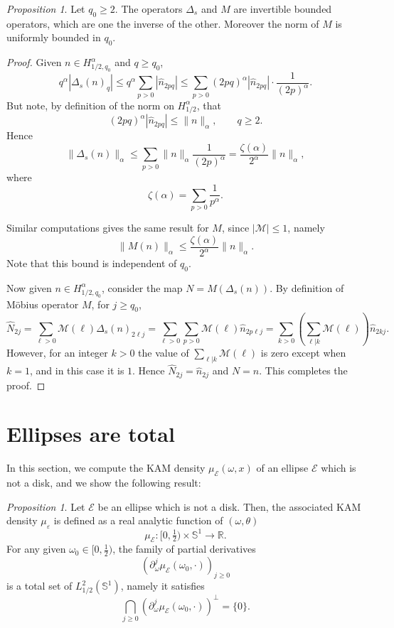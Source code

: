 \documentclass[12pt, openany]{amsart}
\theoremstyle{definition}
\theoremstyle{remark}
\theoremstyle{remark}
\theoremstyle{theorem}
\theoremstyle{theorem}
\theoremstyle{theorem}
\newtheorem{proposition}[theorem]{Proposition}
\theoremstyle{theorem}
\newcommand{\RR}{\mathbb{R}}
\renewcommand{\SS}{\mathbb{S}}
\begin{document}
\begin{proposition}
\label{proposition:invertibility_dirichlet_mobius}
Let $q_0\geq 2$. The operators $\Delta_s$ and $M$ are invertible bounded operators, which are one the inverse of the other. Moreover the norm of $M$ is uniformly bounded in $q_0$.
\end{proposition}

\begin{proof}
Given $n\in H^{\alpha}_{1/2,q_0}$ and $q\geq q_0$, 
\[
q^{\alpha}|\Delta_s(n)_q|
\leq q^{\alpha} \sum_{p>0}|\widehat n_{2p q}|
\leq  \sum_{p>0}(2p q)^{\alpha}|\widehat n_{2p q}|\cdot \frac{1}{(2p)^{\alpha}}.
\]
But note, by definition of the norm on $H^{\alpha}_{1/2}$, that
\[
(2p q)^{\alpha}|\widehat n_{2p q}| \leq \|n\|_{\alpha},\qquad q\geq2.
\]
Hence
\[
\|\Delta_s(n)\|_{\alpha} \leq \sum_{p>0}\|n\|_{\alpha} \frac{1}{(2p)^{\alpha}}
=  \frac{\zeta(\alpha)}{2^{\alpha}}\|n\|_{\alpha},
\]
where
\[
\zeta(\alpha) = \sum_{p>0}\frac{1}{p^{\alpha}}.
\]

Similar computations gives the same result for $M$, since $|\mathscr M|\leq 1$, namely  
\[
\|M(n)\|_{\alpha} \leq \frac{\zeta(\alpha)}{2^{\alpha}}\|n\|_{\alpha}.
\]
Note that this bound is independent of $q_0$.

Now given $n\in H^{\alpha}_{1/2,q_0}$, consider the map $N = M(\Delta_s(n))$. By definition of Möbius operator $M$, for $j\geq q_0$, 
\[
\widehat N_{2j} = \sum_{\ell>0}\mathscr M(\ell)\Delta_s(n)_{2\ell j}
= \sum_{\ell>0}\sum_{p>0}\mathscr M(\ell)\widehat n_{2p\ell j}
= \sum_{k>0}\left(\sum_{\ell|k}\mathscr M(\ell)\right) \widehat n_{2kj}.
\]
However, for an integer $k>0$ the value of $\sum_{\ell|k}\mathscr M(\ell)$ is zero except when $k=1$, and in this case it is $1$. Hence $\widehat N_{2j} = \widehat n_{2j}$ and $N=n$. This completes the proof.
\end{proof}

\section{Ellipses are total}
\label{section:ellipses_total}

In this section, we compute the KAM density $\mu_{\mathscr E}(\omega,x)$ of an ellipse $\mathscr E$ which is not a disk, and we show the following result:

\begin{proposition}
\label{proposition:totality_ellipse}
Let $\mathscr E$ be an ellipse which is not a disk. Then, the associated KAM density $\mu_{\varepsilon}$ is defined as a real analytic function of $(\omega,\theta)$
\[
\mu_{\mathscr E}:[0,\tfrac{1}{2})\times \SS^1\to\RR.
\]
For any given $\omega_0\in[0,\tfrac{1}{2})$, the family of partial derivatives
\[
\left(\partial_{\omega}^{j}\mu_{\mathscr E}(\omega_0,\cdot)\right)_{j\geq 0}
\]
is a total set of $L^2_{1/2}(\SS^1)$, namely it satisfies
\begin{equation}
\label{equation:total_family}
\bigcap_{j\geq 0}\left(\partial_{\omega}^{j}\mu_{\mathscr E}(\omega_0,\cdot)\right)^{\perp} = \{0\}.
\end{equation}
\end{proposition}
\end{document}
